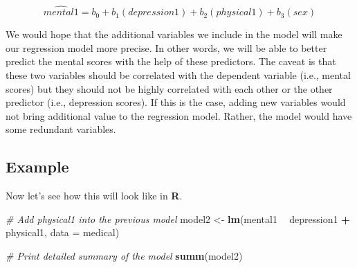 \documentclass[]{book}
\newenvironment{Shaded}{\begin{snugshade}}{\end{snugshade}}
\newcommand{\CommentTok}[1]{\textcolor[rgb]{0.56,0.35,0.01}{\textit{#1}}}
\newcommand{\DataTypeTok}[1]{\textcolor[rgb]{0.13,0.29,0.53}{#1}}
\newcommand{\KeywordTok}[1]{\textcolor[rgb]{0.13,0.29,0.53}{\textbf{#1}}}
\newcommand{\NormalTok}[1]{#1}
\newcommand{\OperatorTok}[1]{\textcolor[rgb]{0.81,0.36,0.00}{\textbf{#1}}}
\newcommand{\StringTok}[1]{\textcolor[rgb]{0.31,0.60,0.02}{#1}}
\begin{document}
\[\hat{mental1} = b_0 + b_1(depression1) + b_2(physical1) + b_3(sex)\]

We would hope that the additional variables we include in the model will make our regression model more precise. In other words, we will be able to better predict the mental scores with the help of these predictors. The caveat is that these two variables should be correlated with the dependent variable (i.e., mental scores) but they should not be highly correlated with each other or the other predictor (i.e., depression scores). If this is the case, adding new variables would not bring additional value to the regression model. Rather, the model would have some redundant variables.

\hypertarget{example-5}{%
\subsection{Example}\label{example-5}}

Now let's see how this will look like in \textbf{R}.

\begin{Shaded}
\begin{Highlighting}[]
\CommentTok{# Add physical1 into the previous model}
\NormalTok{model2 <-}\StringTok{ }\KeywordTok{lm}\NormalTok{(mental1 }\OperatorTok{~}\StringTok{ }\NormalTok{depression1 }\OperatorTok{+}\StringTok{ }\NormalTok{physical1, }\DataTypeTok{data =}\NormalTok{ medical)}

\CommentTok{# Print detailed summary of the model}
\KeywordTok{summ}\NormalTok{(model2)}
\end{Highlighting}
\end{Shaded}
\end{document}
